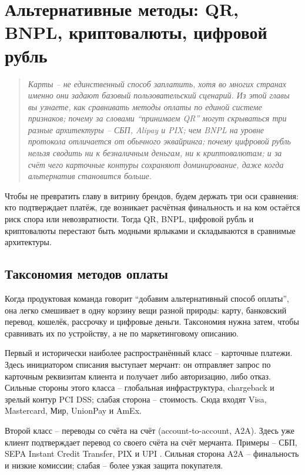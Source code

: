
\chapter{Альтернативные методы: QR, BNPL, криптовалюты, цифровой рубль}
\label{ch:alt-methods}
\begin{quote}
  \itshape
  Карты -- не единственный способ заплатить, хотя во многих странах именно
  они задают базовый пользовательский сценарий. Из этой главы вы узнаете,
  как сравнивать методы оплаты по единой системе признаков; почему за
  словами \enquote{принимаем QR} могут скрываться три разные архитектуры
  -- СБП, Alipay и PIX; чем BNPL на уровне протокола отличается от
  обычного эквайринга; почему цифровой рубль нельзя сводить ни к
  безналичным деньгам, ни к криптовалютам; и за счёт чего карточные
  контуры сохраняют доминирование, даже когда альтернатив становится
  больше.
\end{quote}

Чтобы не превратить главу в витрину брендов, будем держать три оси
сравнения: кто подтверждает платёж, где возникает расчётная финальность
и на ком остаётся риск спора или невозвратности. Тогда QR, BNPL,
цифровой рубль и криптовалюты перестают быть модными ярлыками и
складываются в сравнимые архитектуры.

\section{Таксономия методов оплаты}
\label{sec:alt-taxonomy}

Когда продуктовая команда говорит \enquote{добавим альтернативный способ
оплаты}, она легко смешивает в одну корзину вещи разной природы:
карту, банковский перевод, кошелёк, рассрочку и цифровые деньги.
Таксономия нужна затем, чтобы сравнивать их по устройству, а не по
маркетинговому описанию.

Первый и исторически наиболее распространённый класс -- карточные
платежи.
Здесь инициатором списания выступает мерчант: он отправляет запрос по
карточным реквизитам клиента и получает либо авторизацию, либо отказ.
Сильные стороны этого класса -- глобальная инфраструктура, chargeback
и зрелый контур PCI DSS; слабая сторона -- стоимость. Сюда входят
Visa, Mastercard, Мир, UnionPay и AmEx.

Второй класс -- переводы со счёта на счёт (account-to-account, A2A).
Здесь уже клиент подтверждает перевод со своего счёта на счёт мерчанта.
Примеры -- СБП, SEPA Instant Credit Transfer, PIX и UPI
\cite{sbp-main}\cite{sepa-instant}\cite{pix}\cite{upi}.
Сильная сторона A2A -- финальность и низкие комиссии; слабая --
более узкая защита покупателя.


